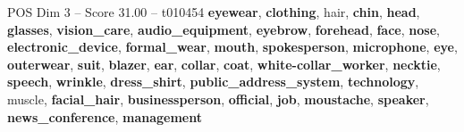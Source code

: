 \begin{textsample}{POS Dim 3 – Score 31.00 – t010454}  \label{ex:f3_pos_028}
\textbf{eyewear}, \textbf{clothing}, hair, \textbf{chin}, \textbf{head}, \textbf{glasses}, \textbf{vision\_care}, \textbf{audio\_equipment}, \textbf{eyebrow}, \textbf{forehead}, \textbf{face}, \textbf{nose}, \textbf{electronic\_device}, \textbf{formal\_wear}, \textbf{mouth}, \textbf{spokesperson}, \textbf{microphone}, \textbf{eye}, \textbf{outerwear}, \textbf{suit}, \textbf{blazer}, \textbf{ear}, \textbf{collar}, \textbf{coat}, \textbf{white-collar\_worker}, \textbf{necktie}, \textbf{speech}, \textbf{wrinkle}, \textbf{dress\_shirt}, \textbf{public\_address\_system}, \textbf{technology}, muscle, \textbf{facial\_hair}, \textbf{businessperson}, \textbf{official}, \textbf{job}, \textbf{moustache}, \textbf{speaker}, \textbf{news\_conference}, \textbf{management}

\end{textsample}
